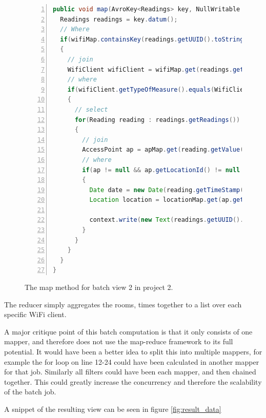 \begin{figure}[H]
	
\begin{lstlisting}[frame=single, backgroundcolor=\color{light-gray}, basicstyle=\footnotesize\ttfamily, language=Java, numbers=left, numberstyle=\tiny \color{black}, breaklines=true]
public void map(AvroKey<Readings> key, NullWritable value, Context context) throws IOException, InterruptedException {
  Readings readings = key.datum();
  // Where
  if(wifiMap.containsKey(readings.getUUID().toString()))
  {
	// join
    WifiClient wifiClient = wifiMap.get(readings.getUUID().toString());
    // where
    if(wifiClient.getTypeOfMeasure().equals(WifiClientMeasure.AccessPoint))
    {
	  // select
      for(Reading reading : readings.getReadings())
      {
	    // join
        AccessPoint ap = apMap.get(reading.getValue());
        // where
        if(ap != null && ap.getLocationId() != null && locationMap.containsKey(ap.getLocationId()))
        {
          Date date = new Date(reading.getTimeStamp());
          Location location = locationMap.get(ap.getLocationId());
           
          context.write(new Text(readings.getUUID().toString()), new Text(location.getRoom() + "-" + dateFormat.format(date)));
        }
      }
    }
  }
}
\end{lstlisting}
\caption{The map method for batch view 2 in project 2.}
\label{code:project2_mapper}
\end{figure}

The reducer simply aggregates the rooms, times together to a list over each specific WiFi client.

\newpar A major critique point of this batch computation is that it only consists of one mapper, and therefore does not use the map-reduce framework to its full potential. It would have been a better idea to split this into multiple mappers, for example the for loop on line 12-24 could have been calculated in another mapper for that job. Similarly all filters could have been each mapper, and then chained together. This could greatly increase the concurrency and therefore the scalability of the batch job.

\newpar A snippet of the resulting view can be seen in figure \ref{fig:result_data}

